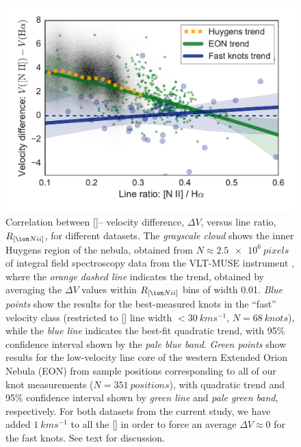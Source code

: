 \documentclass[usenatbib]{mnras}
\begin{document}
\begin{figure}
  \centering
  \includegraphics[width=\linewidth]{knot-dv-versus-nii-ha-ratio}
  \caption{Correlation between [\nii]--\ha{} velocity difference,
    \(\Delta V\), versus line ratio, \(R_{[\nii]}\), for different
    datasets. The \textit{grayscale cloud} shows the inner Huygens
    region of the nebula, obtained from
    \(N \approx \SI{2.5e6}{pixels}\) of integral field spectroscopy
    data from the VLT-MUSE instrument \citep{MUSE}, where the
    \textit{orange dashed line} indicates the trend, obtained by
    averaging the \(\Delta V\) values within \(R_{[\nii]}\) bins of
    width 0.01.  \textit{Blue points} show the results for the
    best-measured knots in the ``fast'' velocity class (restricted to
    [\nii] line width \(< \SI{30}{km s^{-1}}\),
    \(N = \SI{68}{knots}\)), while the \textit{blue line} indicates
    the best-fit quadratic trend, with 95\% confidence interval shown
    by the \textit{pale blue band}.  \textit{Green points} show
    results for the low-velocity line core of the western Extended
    Orion Nebula (EON) from sample positions corresponding to all of
    our knot measurements (\(N = \SI{351}{positions}\)), with
    quadratic trend and 95\% confidence interval shown by
    \textit{green line} and \textit{pale green band}, respectively.
    For both datasets from the current study, we have added
    \(\SI{+1}{km s^{-1}}\) to all the [\nii] in order to force an
    average \(\Delta V \approx 0\) for the fast knots.  See text for
    discussion.}
\end{figure}




\label{lastpage}
\end{document}
